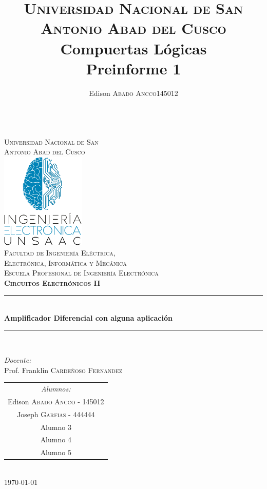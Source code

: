 \documentclass[a4paper]{article} %
\title{
	\textsc{Universidad Nacional de San Antonio Abad del Cusco}\\
	\textbf{Compuertas Lógicas}\\
	Preinforme 1}
\author{
	\begin{tabular}{lr}
		Edison \textsc{Abado Ancco} & 145012 \\
	\end{tabular}
}
\begin{document}
	\begin{titlepage}
		\newcommand{\HRule}{\rule{\linewidth}{0.5mm}} 
		\center
		\textsc{\LARGE \vspace{1.1cm} \\ Universidad Nacional de San \\[0.2cm] Antonio Abad del Cusco}\\[1.2cm] 
		\includegraphics[width=4cm]{IMAGENES/logoLiC}\\[1cm]
		\textsc{\Large Facultad de Ingeniería Eléctrica, \\ Electrónica, Informática y Mecánica}\\[0.5cm] 
		\textsc{\large Escuela Profesional de Ingeniería Electrónica}\\[0.5cm]
		\textsc{\Large \textbf{Circuitos Electrónicos II}}\\[0.5cm] 
		\HRule \\[0.4cm]
		{ \huge \bfseries Amplificador Diferencial con alguna aplicación}\\[0.30cm] 
		\HRule \\[1.4cm]
		\begin{minipage}{\textwidth}
			\center 
			
			\emph{Docente:} \\
			Prof. Franklin  \textsc{Cardeñoso Fernandez} \\[1cm]
			
			\begin{tabular}{c}
				\emph{Alumnos:}  \\
				Edison   \textsc{Abado Ancco} - 145012 \\
				Joseph \textsc{Garfias} - 444444 \\
				Alumno 3 \\
				Alumno 4 \\
				Alumno 5
			\end{tabular}
		\end{minipage}\\[2cm]
		\today
	\end{titlepage}
	
\end{document}
